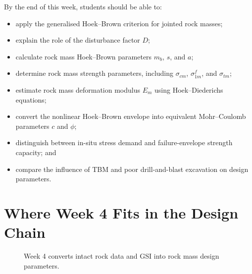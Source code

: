 \documentclass[a4paper,12pt]{article}
\begin{document}
By the end of this week, students should be able to:
\begin{itemize}
    \item apply the generalised Hoek--Brown criterion for jointed rock masses;
    \item explain the role of the disturbance factor \(D\);
    \item calculate rock mass Hoek--Brown parameters \(m_b\), \(s\), and \(a\);
    \item determine rock mass strength parameters, including \(\sigma_{cm}\), \(\sigma_{1m}^f\), and \(\sigma_{tm}\);
    \item estimate rock mass deformation modulus \(E_m\) using Hoek--Diederichs equations;
    \item convert the nonlinear Hoek--Brown envelope into equivalent Mohr--Coulomb parameters \(c\) and \(\phi\);
    \item distinguish between in-situ stress demand and failure-envelope strength capacity; and
    \item compare the influence of TBM and poor drill-and-blast excavation on design parameters.
\end{itemize}

\section{Where Week 4 Fits in the Design Chain}

\begin{figure}[H]
\centering
{}
\caption{Week 4 converts intact rock data and GSI into rock mass design parameters.}
\label{fig:week4_design_chain}
\end{figure}
\end{document}
